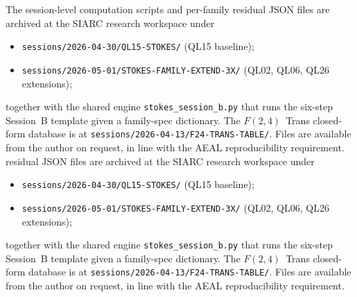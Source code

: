 \documentclass[11pt,reqno]{amsart}
\theoremstyle{definition}
\begin{document}
The session-level computation scripts and per-family
residual JSON files are archived at the SIARC research
workspace under
\begin{itemize}
\item \texttt{sessions/2026-04-30/QL15-STOKES/} (QL15 baseline);
\item \texttt{sessions/2026-05-01/STOKES-FAMILY-EXTEND-3X/}
(QL02, QL06, QL26 extensions);
\end{itemize}
together with the shared engine
\texttt{stokes\_session\_b.py} that runs the six-step
Session~B template given a family-spec dictionary. The
$F(2,4)$~Trans closed-form database is at
\texttt{sessions/2026-04-13/F24-TRANS-TABLE/}. Files are
available from the author on request, in line with the AEAL
reproducibility requirement.
residual JSON files are archived at the SIARC research
workspace under
\begin{itemize}
\item \texttt{sessions/2026-04-30/QL15-STOKES/} (QL15 baseline);
\item \texttt{sessions/2026-05-01/STOKES-FAMILY-EXTEND-3X/}
(QL02, QL06, QL26 extensions);
\end{itemize}
together with the shared engine
\texttt{stokes\_session\_b.py} that runs the six-step
Session~B template given a family-spec dictionary. The
$F(2,4)$~Trans closed-form database is at
\texttt{sessions/2026-04-13/F24-TRANS-TABLE/}. Files are
available from the author on request, in line with the AEAL
reproducibility requirement.
\end{document}
